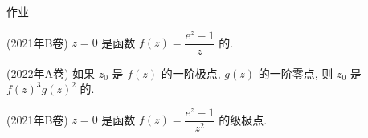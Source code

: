 %
%
%
%
%

{
\homework
\begin{frame}[<*>]{作业}
	\begin{homeworks}
		\item(2021年B卷) $z=0$ 是函数 $f(z)=\dfrac{e^z-1}{z}$ 的\fillbrace.
		\item(2022年A卷) 如果 $z_0$ 是 $f(z)$ 的一阶极点, $g(z)$ 的一阶零点, 则 $z_0$ 是 $f(z)^3g(z)^2$ 的\fillbrace.
		\item(2021年B卷) $z=0$ 是函数 $f(z)=\dfrac{e^z-1}{z^2}$ 的\fillbrace 级极点.
	\end{homeworks}
\end{frame}
}



